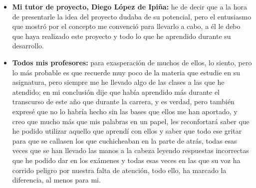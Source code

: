 \begin{itemize}
\item \textbf{Mi tutor de proyecto, Diego López de Ipiña:} he de decir que a la hora de presentarle la idea del proyecto dudaba de su potencial, pero el entusiasmo que mostró por el concepto me convenció para llevarlo a cabo, a él le debo que haya realizado este proyecto y todo lo que he aprendido durante su desarrollo.
\item \textbf{Todos mis profesores:} para exasperación de muchos de ellos, lo siento, pero lo más probable es que recuerde muy poco de la materia que estudie en su asignatura, pero siempre me he llevado algo de las clases a las que he atendido; en mi conclusión dije que había aprendido más durante el transcurso de este año que durante la carrera, y es verdad, pero también expresé que no lo habría hecho sin las bases que ellos me han aportado, y creo que mucho más que mis palabras en un papel, les reconfortará saber que he podido utilizar aquello que aprendí con ellos y saber que todo ese gritar para que se callasen los que cuchicheaban en la parte de atrás, todas esas veces que se han llevado las manos a la cabeza leyendo respuestas incorrectas que he podido dar en los exámenes y todas esas veces en las que su voz ha corrido peligro por nuestra falta de atención, todo ello, ha marcado la diferencia, al menos para mi.

\end{itemize}